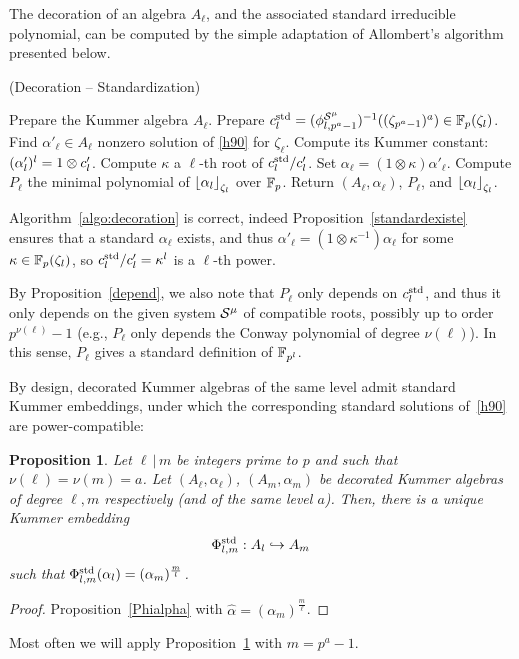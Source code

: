 \documentclass{sig-alternate}
\newtheorem{proposition}[theorem]{Proposition}
\begin{document}
The decoration of an algebra $A_\ell$, and the associated standard
irreducible polynomial, can be computed by the simple adaptation of
Allombert's algorithm presented below. %

\begin{algorithm}
  \caption{(Decoration -- Standardization)}
  \label{algo:decoration}
  \begin{algorithmic}[1]
  \STATE Prepare the Kummer algebra $A_\ell$.
  \STATE Prepare $c^{\mathrm{std}}_l=({\phi^{\mathcal{S}^\mu}_{{l},{p^a-1}}})^{-1}((\zeta_{p^a-1})^a)\in\mathbb{F}_p(\zeta_l)$.
  \STATE Find $\alpha'_\ell\in A_\ell$ nonzero solution of \eqref{h90} for $\zeta_\ell$.
  \STATE Compute its Kummer constant: $(\alpha'_l)^l=1\otimes c'_l$.
  \STATE Compute $\kappa$ a $\ell$-th root of $c^{\mathrm{std}}_l/c'_l$.
  \STATE Set $\alpha_{\ell}=(1\otimes\kappa)\alpha'_\ell$.
  \STATE Compute $P_\ell$ the minimal polynomial of $\left\lfloor \alpha_{l} \right\rfloor_{\zeta_l}$ over $\mathbb{F}_{p}$.
  \STATE Return $(A_\ell,\alpha_\ell)$, $P_\ell$, and $\left\lfloor \alpha_l \right\rfloor_{\zeta_l}$.
  \end{algorithmic}
\end{algorithm}

Algorithm~\ref{algo:decoration} is correct, indeed Proposition~\ref{standardexiste} ensures that
a standard $\alpha_{\ell}$ exists, and thus $\alpha'_\ell=(1\otimes\kappa^{-1})\alpha_{\ell}$
for some $\kappa\in\mathbb{F}_{p}(\zeta_l)$, so $c^{\mathrm{std}}_l/c'_l=\kappa^l$ is a $\ell$-th power.

By Proposition~\ref{depend}, we also note that $P_\ell$ only depends on $c^{\mathrm{std}}_{l}$,
and thus it only depends on the given system $\mathcal{S}^\mu$ of compatible roots,
possibly up to order $p^{\nu(\ell)}-1$
(e.g., $P_\ell$ only depends the Conway polynomial of degree $\nu(\ell)$).
In this sense, $P_\ell$ gives a standard definition of $\mathbb{F}_{p^l}$.

By design, decorated Kummer algebras of the same level admit standard Kummer embeddings,
under which the corresponding standard solutions of~\eqref{h90} are power-compatible:
\begin{proposition}
\label{embedincomplete}
Let $\ell\,|\,m$ be integers prime to $p$ and such that $\nu(\ell)=\nu(m)=a$.
Let $(A_\ell,\alpha_\ell)$, $(A_m,\alpha_m)$ be decorated Kummer algebras
of degree $\ell,m$ respectively (and of the same level $a$).
Then, there is a unique Kummer embedding
\[ {\Phi^{\mathrm{std}}_{{l},{m}}}:A_l\hookrightarrow A_m \]
such that ${\Phi^{\mathrm{std}}_{{l},{m}}}(\alpha_l)=(\alpha_m)^{\frac{m}{l}}$.
\end{proposition}
\begin{proof}
Proposition~\ref{Phialpha} with $\hat{\alpha}=(\alpha_m)^{\frac{m}{\ell}}$.
\end{proof}
Most often we will apply Proposition~\ref{embedincomplete} with $m=p^a-1$.
\end{document}

